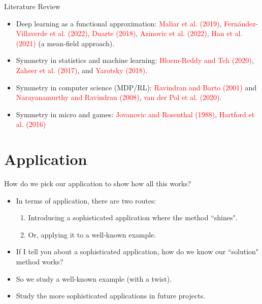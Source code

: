 \documentclass[aspectratio=169,10pt]{beamer}
\begin{document}
\begin{frame}{Literature Review}
	\begin{itemize}
	\item Deep learning as a functional approximation: \textcolor{red}{Maliar et al. (2019)}, \textcolor{red}{Fern\'{a}ndez-Villaverde et al. (2022)}, \textcolor{red}{Duarte (2018)}, \textcolor{red}{Azinovic et al. (2022)}, \textcolor{red}{Han et al. (2021)} (a mean-field approach). \vspace{0.1in}
	\item Symmetry in statistics and machine learning:  \textcolor{red}{Bloem-Reddy and Teh (2020)}, \textcolor{red}{Zaheer et al. (2017)}, and \textcolor{red}{Yarotsky (2018)}.\vspace{0.1in}
	\item Symmetry in computer science (MDP/RL):  \textcolor{red}{Ravindran and Barto (2001)} and \textcolor{red}{Narayanamurthy
	and Ravindran (2008)},  \textcolor{red}{van der Pol et al. (2020)}.\vspace{0.1in}
	\item Symmetry in micro and games: \textcolor{red}{Jovanovic and Rosenthal (1988)},  \textcolor{red}{Hartford et al. (2016)}


	\end{itemize}
\end{frame}

		\section{Application}
		
		\begin{frame}{How do we pick our application to show how all this works?}
			\begin{itemize}
				\item In terms of application, there are two routes:\vspace{0.1in}
				\begin{enumerate}
					\item Introducing a sophisticated application where the method ``shines".\vspace{0.1in}
					\item Or, applying it to a well-known example.\vspace{0.1in} 
				\end{enumerate}
			\item If I tell you about a sophisticated application, how do we know our ``solution" method works?\vspace{0.1in}
			\item So we study a well-known example (with a twist).\vspace{0.1in}
			\item Study the more sophisticated applications in future projects.
			
			\end{itemize}
		\end{frame}
		
\end{document}

